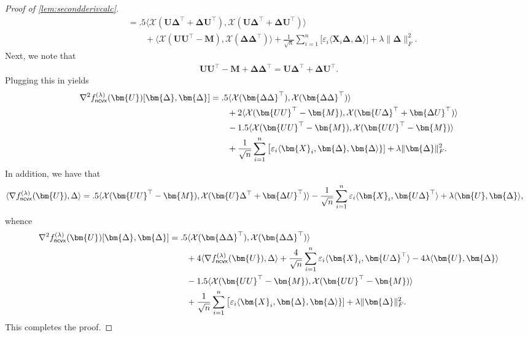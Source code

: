 \documentclass[10pt]{article}
\newcommand{\eps}{\ensuremath{\varepsilon}}
\renewcommand{\t}{^{\top}}
\theoremstyle{definition}
\begin{document}
\begin{proof}[Proof of \cref{lem:secondderivcalc}]
\begin{align}
    &= .5 \big \langle \mathcal{X}( \bm{U\Delta}\t + \bm{\Delta U}\t),\mathcal{X}( \bm{U\Delta}\t + \bm{\Delta U}\t) \big \rangle \\
    &\qquad +  \langle \mathcal{X}( \bm{UU}\t -  \bm{M}   ) ,  \mathcal{X}( \bm{\Delta \Delta}\t) \rangle  + \frac{1}{\sqrt{n}}\sum_{i=1}^{n} \bigg[ \eps_i \langle \bm{X}_i \bm{\Delta}, \bm{\Delta} \rangle \bigg] +\lambda \| \bm{\Delta} \|_F^2.
\end{align}
Next, we note that
\begin{align}
    \bm{UU}\t - \bm{M} + \bm{\Delta \Delta}\t = \bm{U\Delta}\t + \bm{\Delta U}\t.
\end{align}
Plugging this in yields
\begin{align}
   \nabla^2 f^{(\lambda)}_{{\sf ncvx}}(\bm{U})[ \bm{\Delta},\bm{\Delta}] 
    &= .5 \langle \mathcal{X}( \bm{\Delta\Delta}\t ),\mathcal{X}( \bm{\Delta\Delta}\t ) \rangle \\
    &\qquad + 2\langle \mathcal{X}(\bm{UU}\t - \bm{M}), \mathcal{X}(\bm{U\Delta}\t + \bm{\Delta U}\t) \rangle  \\
    &\qquad - 1.5 \langle \mathcal{X}(\bm{UU}\t - \bm{M}) ,\mathcal{X}(\bm{UU}\t - \bm{M}) \rangle \\
    &\qquad + \frac{1}{\sqrt{n}} \sum_{i=1}^{n} \big[ \eps_i \langle \bm{X}_i, \bm{\Delta},\bm{\Delta \rangle}] +  \lambda \| \bm{\Delta}\|_F^2.
\end{align}
In addition, we have that
\begin{align}
  \langle \nabla f^{(\lambda)}_{{\sf ncvx}}(\bm{U}), \Delta \rangle &= .5 \langle \mathcal{X}( \bm{UU}\t - \bm{M}), \mathcal{X}(\bm{U} \Delta\t + \bm{\Delta U}\t ) \rangle - \frac{1}{\sqrt{n}} \sum_{i=1}^{n} \eps_i \langle \bm{X}_i, \bm{U \Delta}\t\rangle + \lambda \langle \bm{U}, \bm{\Delta} \rangle,
\end{align}
whence
\begin{align}
     \nabla^2 f^{(\lambda)}_{{\sf ncvx}}(\bm{U}) [ \bm{\Delta},\bm{\Delta}] &= .5 \langle \mathcal{X}(\bm{\Delta \Delta}\t), \mathcal{X}(\bm{\Delta \Delta}\t) \rangle \\
    &\qquad + 4  \langle \nabla f^{(\lambda)}_{{\sf ncvx}}(\bm{U}),\Delta \rangle + \frac{4}{\sqrt{n}} \sum_{i=1}^{n} \eps_i\langle \bm{X}_i, \bm{U\Delta}\t \rangle - 4 \lambda \langle \bm{U},\bm{\Delta} \rangle \\
   &\qquad - 1.5 \langle \mathcal{X}(\bm{UU}\t - \bm{M}) ,\mathcal{X}(\bm{UU}\t - \bm{M}) \rangle \\
    &\qquad + \frac{1}{\sqrt{n}} \sum_{i=1}^{n} \big[ \eps_i \langle \bm{X}_i, \bm{\Delta},\bm{\Delta \rangle}] +  \lambda \| \bm{\Delta}\|_F^2.
\end{align}
This completes the proof.
\end{proof}
\end{document}
